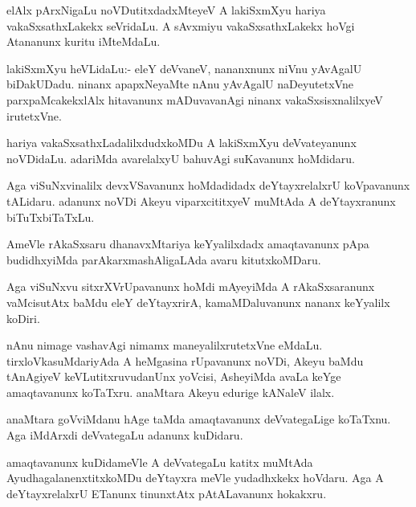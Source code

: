 \documentclass{article}
\begin{document}
\begin{mn}
elAlx pArxNigaLu noVDutitxdadxMteyeV A lakiSxmXyu hariya
vakaSxsathxLakekx seVridaLu. A sAvxmiyu vakaSxsathxLakekx hoVgi
Atananunx kuritu iMteMdaLu.
\end{mn}

\begin{mn}%
lakiSxmXyu heVLidaLu:- eleY deVvaneV, nananxnunx niVnu yAvAgalU
biDakUDadu. ninanx apapxNeyaMte nAnu yAvAgalU naDeyutetxVne
parxpaMcakekxlAlx hitavanunx mADuvavanAgi ninanx vakaSxsisxnalilxyeV irutetxVne.
\end{mn}

\begin{mn}
hariya vakaSxsathxLadalilxdudxkoMDu A lakiSxmXyu deVvateyanunx
noVDidaLu. adariMda avarelalxyU bahuvAgi suKavanunx hoMdidaru.
\end{mn}

\begin{mn}
Aga viSuNxvinalilx devxVSavanunx hoMdadidadx deYtayxrelalxrU
koVpavanunx tALidaru. adanunx noVDi Akeyu viparxcititxyeV muMtAda A
deYtayxranunx biTuTxbiTaTxLu.
\end{mn}

\begin{mn}%
AmeVle rAkaSxsaru dhanavxMtariya keYyalilxdadx amaqtavanunx pApa
budidhxyiMda parAkarxmashAligaLAda avaru kitutxkoMDaru.
\end{mn}

\begin{mn}
Aga viSuNxvu sitxrXVrUpavanunx hoMdi mAyeyiMda A rAkaSxsaranunx
vaMcisutAtx baMdu eleY deYtayxrirA, kamaMDaluvanunx nananx keYyalilx koDiri.
\end{mn}

\begin{mn}%
nAnu nimage vashavAgi nimamx maneyalilxrutetxVne
eMdaLu. tirxloVkasuMdariyAda A heMgasina rUpavanunx noVDi, Akeyu baMdu
tAnAgiyeV keVLutitxruvudanUnx yoVcisi, AsheyiMda avaLa keYge
amaqtavanunx koTaTxru. anaMtara Akeyu edurige kANaleV ilalx.
\end{mn}

\begin{mn}
anaMtara goVviMdanu hAge taMda amaqtavanunx deVvategaLige
koTaTxnu. Aga iMdArxdi deVvategaLu adanunx kuDidaru.
\end{mn}

\begin{mn}%
amaqtavanunx kuDidameVle A deVvategaLu katitx muMtAda
AyudhagalanenxtitxkoMDu deYtayxra meVle yudadhxkekx hoVdaru. Aga A
deYtayxrelalxrU ETanunx tinunxtAtx pAtALavanunx hokakxru.
\end{mn}
\end{document}

